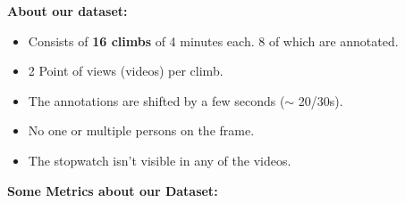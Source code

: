 \begin{frame}
    \textbf{About our dataset:}

    \vspace{0.5em}

    \begin{itemize}
        \item Consists of \textbf{16 climbs} of 4 minutes each. 8 of which are annotated.\\
        \item 2 Point of views (videos) per climb.
        \item The annotations are shifted by a few seconds ($\sim$ 20/30s).
        \item No one or multiple persons on the frame.
        \item The stopwatch isn't visible in any of the videos.
    \end{itemize}

    \vspace{1em}

    \textbf{Some Metrics about our Dataset:}

    \vspace{0.5em}
    
    
\end{frame}
